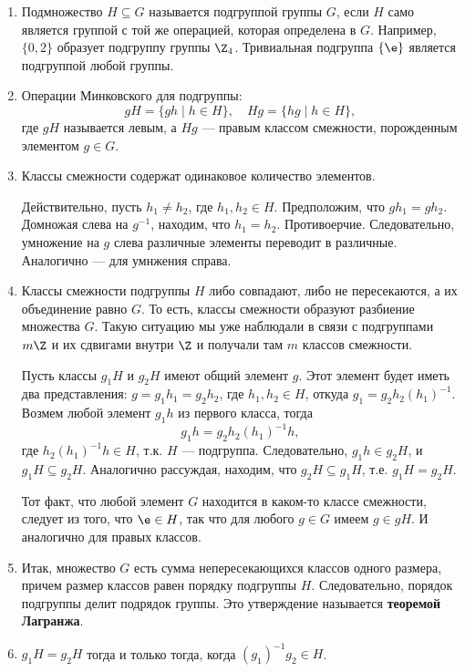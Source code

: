 \begin{enumerate}
\item Подмножество $H\subseteq G$ называется подгруппой группы $G$, если $H$ само является группой с той же операцией, которая определена в $G$. Например, $\{0,2\}$ образует подгруппу группы $\Z_4$. Тривиальная подгруппа $\{\e\}$ является подгруппой любой группы.

\item Операции Минковского для подгруппы:
$$
gH=\{gh\mid h\in H\},\quad Hg=\{hg\mid h\in H\},
$$
где $gH$ называется левым, а $Hg$ --- правым классом смежности, порожденным элементом $g\in G$.

\item Классы смежности содержат одинаковое количество элементов.

Действительно, пусть $h_1\ne h_2$, где $h_1,h_2\in H$. Предположим, что $gh_1=gh_2$. Домножая слева на $g^{-1}$, находим, что $h_1=h_2$. Противоерчие. Следовательно, умножение на $g$ слева различные элементы переводит в различные. Аналогично --- для умнжения справа.

\item Классы смежности подгруппы $H$ либо совпадают, либо не пересекаются, а их объединение равно $G$. То есть, классы смежности образуют разбиение множества $G$. Такую ситуацию мы уже наблюдали в связи с подгруппами $m\Z$ и их сдвигами внутри $\Z$ и получали там $m$ классов смежности.

Пусть классы $g_1H$ и $g_2H$ имеют общий элемент $g$. Этот элемент будет иметь два представления: $g=g_1h_1=g_2h_2$, где $h_1,h_2\in H$, откуда $g_1=g_2h_2(h_1)^{-1}$. Возмем любой элемент $g_1h$ из первого класса, тогда
$$
g_1h = g_2h_2(h_1)^{-1}h,
$$
где $h_2(h_1)^{-1}h\in H$, т.к. $H$ --- подгруппа. Следовательно, $g_1h\in g_2H$, и $g_1H\subseteq g_2H$. Аналогично рассуждая, находим, что $g_2H\subseteq g_1H$, т.е. $g_1H=g_2H$.

Тот факт, что любой элемент $G$ находится в каком-то классе смежности, следует из того, что $\e\in H$, так что для любого $g\in G$ имеем $g\in gH$. И аналогично для правых классов.

\item Итак, множество $G$ есть сумма непересекающихся классов одного размера, причем размер классов равен порядку подгруппы $H$. Следовательно, порядок подгруппы делит подрядок группы. Это утверждение называется \textbf{теоремой Лагранжа}.

\item $g_1H=g_2H$ тогда и только тогда, когда $(g_1)^{-1}g_2\in H$.


\end{enumerate}
